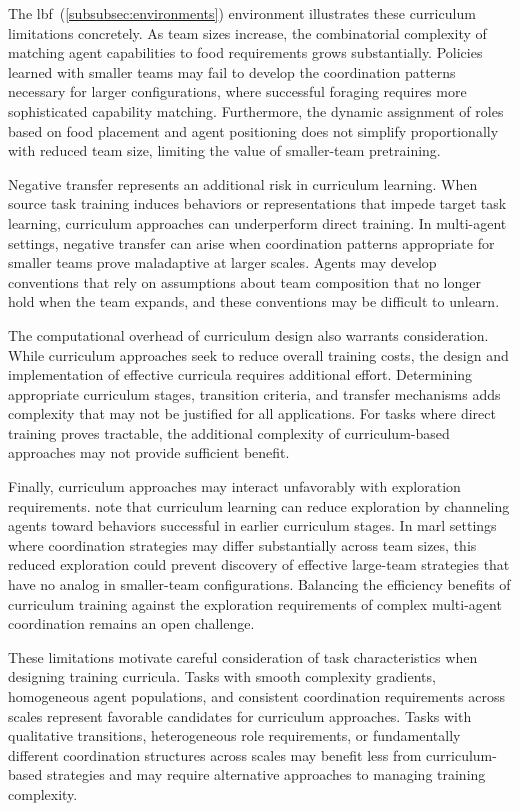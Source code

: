 The \gls{lbf}~(\cref{subsubsec:environments}) environment illustrates 
these curriculum limitations concretely. As team sizes increase, 
the combinatorial complexity of matching agent capabilities to food 
requirements grows substantially. Policies learned with smaller 
teams may fail to develop the coordination patterns necessary 
for larger configurations, where successful foraging requires more 
sophisticated capability matching. Furthermore, the dynamic assignment 
of roles based on food placement and agent positioning does not simplify 
proportionally with reduced team size, limiting the value of smaller-team pretraining.

Negative transfer represents an additional risk in curriculum learning. 
When source task training induces behaviors or representations that impede 
target task learning, curriculum approaches can underperform direct training. 
In multi-agent settings, negative transfer can arise when coordination 
patterns appropriate for smaller teams prove maladaptive at larger scales. 
Agents may develop conventions that rely on assumptions about team composition 
that no longer hold when the team expands, and these conventions may 
be difficult to unlearn.

The computational overhead of curriculum design also warrants consideration. 
While curriculum approaches seek to reduce overall training costs, 
the design and implementation of effective curricula requires 
additional effort. Determining appropriate curriculum stages, 
transition criteria, and transfer mechanisms adds complexity 
that may not be justified for all applications. For tasks where 
direct training proves tractable, the additional complexity of 
curriculum-based approaches may not provide sufficient benefit.

Finally, curriculum approaches may interact unfavorably with 
exploration requirements. \cite{narvekar2020} note that curriculum 
learning can reduce exploration by channeling agents toward behaviors 
successful in earlier curriculum stages. In \gls{marl} settings where 
coordination strategies may differ substantially across team sizes, 
this reduced exploration could prevent discovery of effective large-team 
strategies that have no analog in smaller-team configurations. 
Balancing the efficiency benefits of curriculum training against the 
exploration requirements of complex multi-agent coordination remains 
an open challenge.

These limitations motivate careful consideration of task characteristics 
when designing training curricula. Tasks with smooth complexity gradients, 
homogeneous agent populations, and consistent coordination requirements 
across scales represent favorable candidates for curriculum approaches. 
Tasks with qualitative transitions, heterogeneous role requirements, 
or fundamentally different coordination structures across scales may 
benefit less from curriculum-based strategies and may require 
alternative approaches to managing training complexity.

